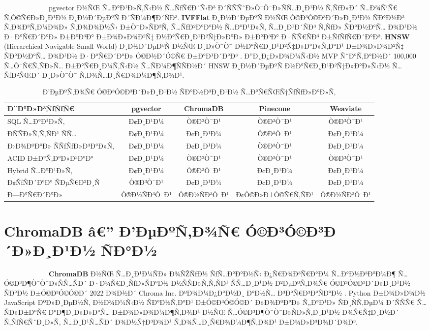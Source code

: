 \documentclass[12pt,A4]{report}
\begin{document}
\ \ \ \ \ \ \ \ \  \ \ \ \ pgvector Ð½ÑŒ Ñ…Ð°Ð¹Ð»Ñ‚Ñ‹Ð½ Ñ…ÑƒÑ€Ð´Ñ‹Ð³ Ð´ÑÑÑˆÐ»Ò¯Ò¯Ð»ÑÑ…Ð¸Ð¹Ð½
Ñ‚ÑƒÐ»Ð´ Ñ…Ð¾Ñ‘Ñ€ Ñ‚Ó©Ñ€Ð»Ð¸Ð¹Ð½ Ð¸Ð½Ð´ÐµÐºÑ Ð´ÑÐ¼Ð¶Ð´ÑÐ³. \textbf{IVFFlat} Ð¸Ð½Ð´ÐµÐºÑ Ð½ÑŒ
Ó©Ð³Ó©Ð³Ð´Ð»Ð¸Ð¹Ð½ ÑÐ°Ð½Ð³ Ñ‚Ð¾Ð³Ñ‚Ð¼Ð¾Ð» Ñ‚Ð¾Ð¾Ð½Ñ‹ Ð±Ò¯Ð»ÑÐ³Ñ‚ Ñ…ÑƒÐ²Ð°Ð°Ð½ Ñ…Ð°Ð¹Ð»Ñ‚ Ñ…Ð¸Ð¹Ð´ÑÐ³ Ñ‚ÑƒÐ»
ÑÐ°Ð½Ð°Ñ… Ð¾Ð¹Ð½ Ð·Ð°Ñ€Ð´Ð°Ð» Ð±Ð°Ð³Ð° Ð±Ð¾Ð»Ð¾Ð²Ñ‡ Ð½Ð°Ñ€Ð¸Ð¹Ð²Ñ‡Ð»Ð°Ð» Ð±Ð°Ð³Ð° Ð·ÑÑ€ÑÐ³ Ð±ÑƒÑƒÑ€Ð´Ð°Ð³.
\textbf{HNSW} (Hierarchical Navigable Small World) Ð¸Ð½Ð´ÐµÐºÑ Ð½ÑŒ
Ð¸Ð»Ò¯Ò¯ Ð½Ð°Ñ€Ð¸Ð¹Ð²Ñ‡Ð»Ð°Ð»Ñ‚Ð°Ð¹ Ð±Ð¾Ð»Ð¾Ð²Ñ‡ ÑÐ°Ð½Ð°Ñ… Ð¾Ð¹Ð½ Ð·Ð°Ñ€Ð´Ð°Ð» Ó©Ð½Ð´Ó©Ñ€ Ð±Ð°Ð¹Ð´Ð°Ð³
\cite{malkov2018hnsw}. Ð”Ð¸Ð¿Ð»Ð¾Ð¼Ñ‹Ð½ MVP ÑˆÐ°Ñ‚Ð°Ð½Ð´ 100,000 Ñ…Ò¯Ñ€Ñ‚ÑÐ»Ñ…
Ð±Ð°Ñ€Ð¸Ð¼Ñ‚Ñ‹Ð½ Ñ…ÑÐ¼Ð¶ÑÑÐ½Ð´ HNSW Ð¸Ð½Ð´ÐµÐºÑ Ð½Ð°Ñ€Ð¸Ð¹Ð²Ñ‡Ð»Ð°Ð»Ñ‹Ð½ Ñ…ÑƒÐ²ÑŒÐ´ Ð¸Ð»Ò¯Ò¯
Ñ‚Ð¾Ñ…Ð¸Ñ€Ð¾Ð¼Ð¶Ñ‚Ð¾Ð¹.

\begin{table}[h]
\centering
\caption{Ð’ÐµÐºÑ‚Ð¾Ñ€ Ó©Ð³Ó©Ð³Ð´Ð»Ð¸Ð¹Ð½ ÑÐ°Ð½Ð³Ð¸Ð¹Ð½ Ñ…Ð°Ñ€ÑŒÑ†ÑƒÑƒÐ»Ð°Ð»Ñ‚}
\begin{tabular}{|l|c|c|c|c|}
\hline
\textbf{Ð¨Ð°Ð»Ð³ÑƒÑƒÑ€} & \textbf{pgvector} & \textbf{ChromaDB} &
\textbf{Pinecone} & \textbf{Weaviate} \\
\hline
SQL Ñ…Ð°Ð¹Ð»Ñ‚           & Ð¢Ð¸Ð¹Ð¼   & Ò®Ð³Ò¯Ð¹   & Ò®Ð³Ò¯Ð¹   & Ò®Ð³Ò¯Ð¹ \\
ÐÑÑÐ»Ñ‚Ñ‚ÑÐ¹ ÑÑ…         & Ð¢Ð¸Ð¹Ð¼   & Ð¢Ð¸Ð¹Ð¼   & Ò®Ð³Ò¯Ð¹   & Ð¢Ð¸Ð¹Ð¼ \\
Ð›Ð¾ÐºÐ°Ð» ÑÑƒÑƒÐ»Ð³Ð°Ð»Ñ‚      & Ð¢Ð¸Ð¹Ð¼   & Ð¢Ð¸Ð¹Ð¼   & Ò®Ð³Ò¯Ð¹   & Ð¢Ð¸Ð¹Ð¼ \\
ACID Ð±Ð°Ñ‚Ð°Ð»Ð³Ð°Ð°       & Ð¢Ð¸Ð¹Ð¼   & Ò®Ð³Ò¯Ð¹   & Ò®Ð³Ò¯Ð¹   & Ò®Ð³Ò¯Ð¹ \\
Hybrid Ñ…Ð°Ð¹Ð»Ñ‚        & Ð¢Ð¸Ð¹Ð¼   & Ò®Ð³Ò¯Ð¹   & Ð¢Ð¸Ð¹Ð¼   & Ð¢Ð¸Ð¹Ð¼ \\
Ð¢ÑƒÑÐ´Ð°Ð° ÑÐµÑ€Ð²Ð¸Ñ       & Ò®Ð³Ò¯Ð¹   & Ð¢Ð¸Ð¹Ð¼   & Ð¢Ð¸Ð¹Ð¼   & Ð¢Ð¸Ð¹Ð¼ \\
Ð—Ð°Ñ€Ð´Ð°Ð»              & Ò®Ð½ÑÐ³Ò¯Ð¹ & Ò®Ð½ÑÐ³Ò¯Ð¹ & Ð¢Ó©Ð»Ð±Ó©Ñ€Ñ‚ÑÐ¹ & Ò®Ð½ÑÐ³Ò¯Ð¹ \\
\hline
\end{tabular}
\label{tab:vectordb_comparison}
\end{table}

\section{ChromaDB â€” Ð’ÐµÐºÑ‚Ð¾Ñ€ Ó©Ð³Ó©Ð³Ð´Ð»Ð¸Ð¹Ð½ ÑÐ°Ð½}

\ \ \ \ \ \ \ \ \  \ \ \ \ \textbf{ChromaDB} Ð½ÑŒ Ñ…Ð¸Ð¹Ð¼ÑÐ» Ð¾ÑŽÑƒÐ½ ÑƒÑ…Ð°Ð°Ð½Ñ‹
Ð¿Ñ€Ð¾Ð³Ñ€Ð°Ð¼ Ñ…Ð°Ð½Ð³Ð°Ð¼Ð¶ Ñ…Ó©Ð³Ð¶Ò¯Ò¯Ð»ÑÑ…ÑÐ´ Ð·Ð¾Ñ€Ð¸ÑƒÐ»ÑÐ°Ð½ Ð½ÑÑÐ»Ñ‚Ñ‚ÑÐ¹ ÑÑ…Ð¸Ð¹Ð½ Ð²ÐµÐºÑ‚Ð¾Ñ€
Ó©Ð³Ó©Ð³Ð´Ð»Ð¸Ð¹Ð½ ÑÐ°Ð½ Ð±Ó©Ð³Ó©Ó©Ð´ 2022 Ð¾Ð½Ð´ Chroma Inc. ÐºÐ¾Ð¼Ð¿Ð°Ð½Ð¸ Ð°Ð½Ñ… Ð³Ð°Ñ€Ð³Ð°ÑÐ°Ð½
\cite{chromadb2024}. Python Ð±Ð¾Ð»Ð¾Ð½ JavaScript ÐºÐ»Ð¸ÐµÐ½Ñ‚ Ð½Ð¾Ð¼Ñ‹Ð½ ÑÐ°Ð½Ñ‚Ð°Ð¹
Ð±Ó©Ð³Ó©Ó©Ð´ Ð»Ð¾ÐºÐ°Ð» Ñ„Ð°Ð¹Ð» ÑÐ¸ÑÑ‚ÐµÐ¼ Ð´ÑÑÑ€ Ñ…ÑÐ»Ð±Ð°Ñ€ Ð°Ð¶Ð¸Ð»Ð»Ð°Ñ… Ð±Ð¾Ð»Ð¾Ð¼Ð¶Ñ‚Ð¾Ð¹ Ð½ÑŒ
Ñ…Ó©Ð³Ð¶Ò¯Ò¯Ð»ÑÐ»Ñ‚Ð¸Ð¹Ð½ Ð¾Ñ€Ñ‡Ð¸Ð½Ð´ Ñ‚ÑƒÑ€ÑˆÐ¸Ð»Ñ‚ Ñ…Ð¸Ð¹Ñ…ÑÐ´ Ð¾Ð½Ñ†Ð³Ð¾Ð¹ Ñ‚Ð¾Ñ…Ð¸Ñ€Ð¾Ð¼Ð¶Ñ‚Ð¾Ð¹ Ð±Ð¾Ð»Ð³Ð¾Ð´Ð¾Ð³.
\end{document}
